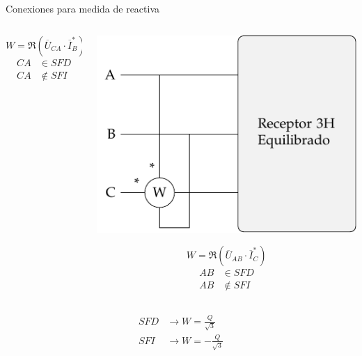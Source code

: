 \documentclass[xcolor={usenames,svgnames,dvipsnames}]{beamer}
\begin{document}
\begin{frame}[label={sec:orgb3d48ad}]{Conexiones para medida de reactiva}
\begin{columns}
\begin{column}{0.33\columnwidth}
\begin{center}
\end{center}
\[
  W = \Re(\overline{U}_{CA} \cdot \overline{I}_B^*)
\]
\begin{align*}
  CA &\in SFD\\
  CA &\notin SFI
\end{align*}
\end{column}
\begin{column}{0.33\columnwidth}
\begin{center}
\includegraphics[width=.9\linewidth]{figs/Reactiva3H_C-AB.pdf}
\end{center}
\[
  W = \Re(\overline{U}_{AB} \cdot \overline{I}_C^*)
\]
\begin{align*}
  AB &\in SFD\\
  AB &\notin SFI
\end{align*}
\end{column}
\end{columns}
\begin{align*}
SFD &\rightarrow \boxed{W = \frac{Q}{\sqrt{3}}}\\
SFI &\rightarrow \boxed{W =  - \frac{Q}{\sqrt{3}}}
\end{align*}
\end{frame}
\end{document}
